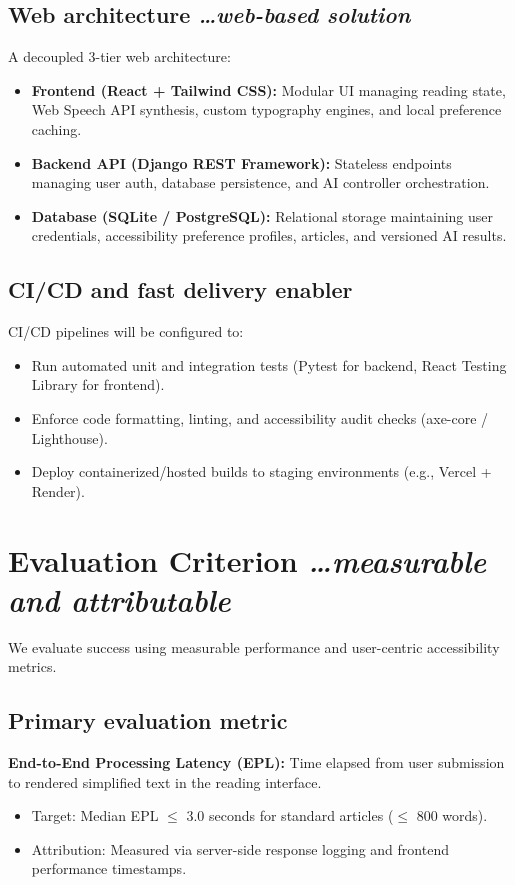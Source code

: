 \documentclass[11pt,a4paper]{article}
\newcommand{\BvrHint}[1]{%
  {\normalfont\normalsize\itshape\hfill #1}}
\begin{document}
\subsection{Web architecture %
\BvrHint{\ldots web-based solution}}
A decoupled 3-tier web architecture:
\begin{itemize}[leftmargin=0.7cm]
    \item \textbf{Frontend (React + Tailwind CSS):} Modular UI managing reading state, Web Speech API synthesis, custom typography engines, and local preference caching.
    \item \textbf{Backend API (Django REST Framework):} Stateless endpoints managing user auth, database persistence, and AI controller orchestration.
    \item \textbf{Database (SQLite / PostgreSQL):} Relational storage maintaining user credentials, accessibility preference profiles, articles, and versioned AI results.
\end{itemize}

\subsection{CI/CD and fast delivery enabler}
CI/CD pipelines will be configured to:
\begin{itemize}[leftmargin=0.7cm]
    \item Run automated unit and integration tests (Pytest for backend, React Testing Library for frontend).
    \item Enforce code formatting, linting, and accessibility audit checks (axe-core / Lighthouse).
    \item Deploy containerized/hosted builds to staging environments (e.g., Vercel + Render).
\end{itemize}

\section{Evaluation Criterion %
\BvrHint{\ldots measurable and attributable}}
We evaluate success using measurable performance and user-centric accessibility metrics.

\subsection{Primary evaluation metric}
\textbf{End-to-End Processing Latency (EPL):} Time elapsed from user submission to rendered simplified text in the reading interface.
\begin{itemize}[leftmargin=0.7cm]
    \item Target: Median EPL $\le$ 3.0 seconds for standard articles ($\le$ 800 words).
    \item Attribution: Measured via server-side response logging and frontend performance timestamps.
\end{itemize}
\end{document}
